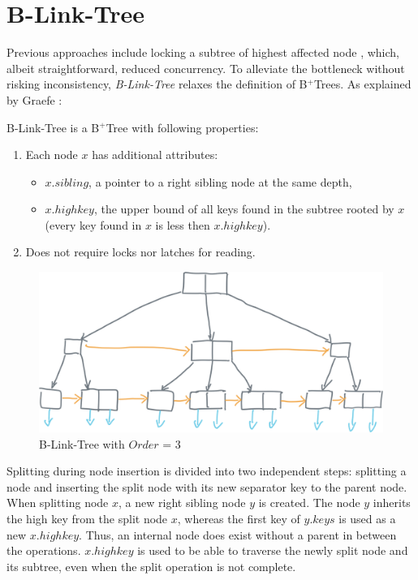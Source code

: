 \section{B-Link-Tree}\label{section:b-link-tree}

Previous approaches include locking a subtree of highest affected node \cite{samadi1976b}, which, albeit straightforward, reduced concurrency. To alleviate the bottleneck without risking inconsistency, \textit{B-Link-Tree} relaxes the definition of B$^+$Trees. As explained by Graefe \cite{goetz-tech}:

\begin{definition}
  B-Link-Tree is a B$^+$Tree with following properties:
  \begin{enumerate}
    \item Each node $x$ has additional attributes:
          \begin{itemize}
            \item $x.sibling$, a pointer to a right sibling node at the same depth,
            \item $x.highkey$, the upper bound of all keys found in the subtree rooted by $x$ (every key found in $x$ is less then $x.highkey$).
          \end{itemize}
    \item Does not require locks nor latches for reading.
  \end{enumerate}
\end{definition}

\begin{figure}[H]
  \centering
  \includegraphics[width=\textwidth]{components/figure/b-link-tree.png}
  \caption{B-Link-Tree with $Order$ = 3}
  \label{figure:b-link-tree}
\end{figure}

Splitting during node insertion is divided into two independent steps: splitting a node and inserting the split node with its new separator key to the parent node. When splitting node $x$, a new right sibling node $y$ is created. The node $y$ inherits the high key from the split node $x$, whereas the first key of $y.keys$ is used as a new $x.highkey$. Thus, an internal node does exist without a parent in between the operations. $x.highkey$ is used to be able to traverse the newly split node and its subtree, even when the split operation is not complete.

